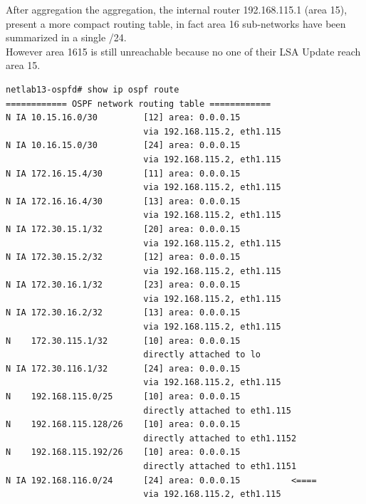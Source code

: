 \documentclass{llncs}
\begin{document}
After aggregation the aggregation, the internal router 192.168.115.1 (area 15), present a more compact routing table, in fact area 16 sub-networks have been summarized in a single /24.\\
However area 1615 is still unreachable because no one of their LSA Update reach area 15.
\\
\lstset{language=sh, caption=Routing table of router 192.168.115.1 after aggregation basicstyle=\ttfamily\scriptsize , breaklines=true}
\begin{lstlisting}
netlab13-ospfd# show ip ospf route 
============ OSPF network routing table ============
N IA 10.15.16.0/30         [12] area: 0.0.0.15
                           via 192.168.115.2, eth1.115
N IA 10.16.15.0/30         [24] area: 0.0.0.15
                           via 192.168.115.2, eth1.115
N IA 172.16.15.4/30        [11] area: 0.0.0.15
                           via 192.168.115.2, eth1.115
N IA 172.16.16.4/30        [13] area: 0.0.0.15
                           via 192.168.115.2, eth1.115
N IA 172.30.15.1/32        [20] area: 0.0.0.15
                           via 192.168.115.2, eth1.115
N IA 172.30.15.2/32        [12] area: 0.0.0.15
                           via 192.168.115.2, eth1.115
N IA 172.30.16.1/32        [23] area: 0.0.0.15
                           via 192.168.115.2, eth1.115
N IA 172.30.16.2/32        [13] area: 0.0.0.15
                           via 192.168.115.2, eth1.115
N    172.30.115.1/32       [10] area: 0.0.0.15
                           directly attached to lo
N IA 172.30.116.1/32       [24] area: 0.0.0.15
                           via 192.168.115.2, eth1.115
N    192.168.115.0/25      [10] area: 0.0.0.15
                           directly attached to eth1.115
N    192.168.115.128/26    [10] area: 0.0.0.15
                           directly attached to eth1.1152
N    192.168.115.192/26    [10] area: 0.0.0.15
                           directly attached to eth1.1151
N IA 192.168.116.0/24      [24] area: 0.0.0.15			<====
                           via 192.168.115.2, eth1.115
\end{lstlisting}
\end{document}
